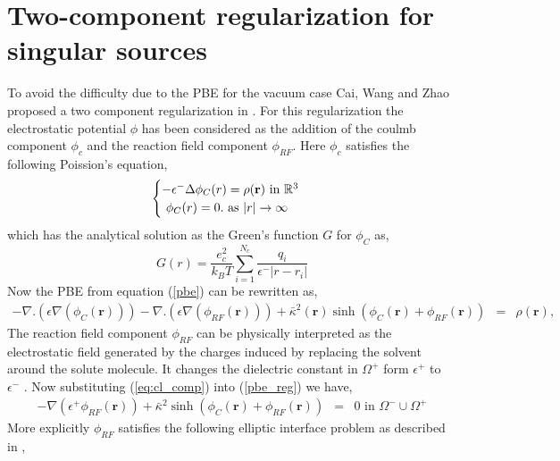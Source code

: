 \section{Two-component regularization for singular sources}
\label{2_comp_reg}
To avoid the difficulty due to the PBE for the vacuum case Cai, Wang and Zhao proposed a two component regularization in \cite{Cai2009} . For this regularization the electrostatic potential $\phi$ has been considered as the addition of the coulmb component $\phi_c$ and the reaction field component $\phi_{RF}$.
Here $\phi_c$ satisfies the following Poission's equation, 
\begin{equation}
	\begin{cases}
		-\epsilon^- \Delta\phi_C(r) = \rho({\bf r}) \text{   in   }\mathbb{R}^3 \label{rho_eq} \\
		\text{      }\phi_C(r)= 0. \text{   as  } |r| \rightarrow \infty
	\end{cases}
\end{equation}\label{eq:cl_comp}
which has the analytical solution as the Green's function $G$ for $\phi_C$ as,
\begin{equation}
	G(r) = \frac{e_c^2}{k_B T } \sum_{i=1}^{N_c} \frac{q_i }{\epsilon^{-}|r-r_i|} \label{eq:green} %
\end{equation}
Now the PBE from equation (\ref{pbe}) can be rewritten as,
\begin{eqnarray}
		-\nabla.(\epsilon\nabla (\phi_C(\textbf{r})))-\nabla.(\epsilon\nabla (\phi_{RF}(\textbf{r})))+\bar\kappa^2(\textbf{r}) \sinh (\phi_C(\textbf{r})+\phi_{RF}(\textbf{r}))&=&\rho(\textbf{r}), \label{pbe_reg} %
\end{eqnarray}
The reaction field component $\phi_{RF}$ can be physically interpreted as the electrostatic field generated by the charges induced by replacing the solvent around the solute molecule. It changes the dielectric constant in $\Omega^+$ form $\epsilon^+$ to $\epsilon^-$ \cite{Cai2009}. Now substituting (\ref{eq:cl_comp}) into (\ref{pbe_reg}) we have,
\begin{eqnarray}
-\nabla(\epsilon^+ \phi_{RF}(\textbf{r})) +\bar\kappa^2 \sinh(\phi_C(\textbf{r})+\phi_{RF}(\textbf{r}))&=& 0 \text{ in } \Omega^- \cup \Omega^+	
\end{eqnarray}
More explicitly $\phi_{RF}$ satisfies the following elliptic interface problem as described in \cite{Chen2007}, 
